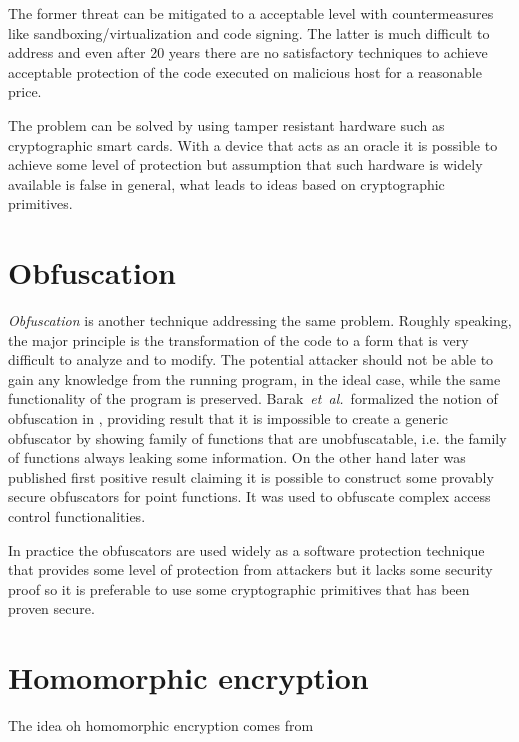 \documentclass[11pt,oneside,final]{fithesis2}
\newcommand{\eal}{\emph{et~al.}}
\begin{document}
    The former threat can be mitigated to a acceptable level with countermeasures like sandboxing/virtualization and code signing. The latter is much difficult to address 
    and even after 20 years there are no satisfactory techniques to achieve acceptable protection of the code executed on malicious host for a reasonable price.
    
    The problem can be solved by using tamper resistant hardware such as cryptographic smart cards. With a device that acts as an oracle it is possible to achieve some
    level of protection but assumption that such hardware is widely available is false in general, what leads to ideas based on cryptographic primitives.
    
    \section{Obfuscation}
    
    \emph{Obfuscation} is another technique addressing the same problem. Roughly speaking, the major principle is the transformation of the code to a form that is very difficult 
    to analyze and to modify. The potential attacker should not be able to gain any knowledge from the running program, in the ideal case, while the same functionality 
    of the program is preserved. Barak~\eal~formalized the notion of obfuscation in \citep{Barak:2012:POP:2160158.2160159}, providing result that it is impossible 
    to create a generic obfuscator by showing family of functions that are unobfuscatable, i.e. the family of functions always leaking some information. On the other hand
    later was published first positive result \citep{Lynn04positiveresults} claiming it is possible to construct some provably secure obfuscators for point functions.
    It was used to obfuscate complex access control functionalities.
    
    In practice the obfuscators are used widely as a software protection technique that provides some level of protection from attackers but it lacks some 
    security proof so it is preferable to use some cryptographic primitives that has been proven secure. 
    
\section{Homomorphic encryption}
    The idea oh homomorphic encryption comes from 
    
\end{document}
